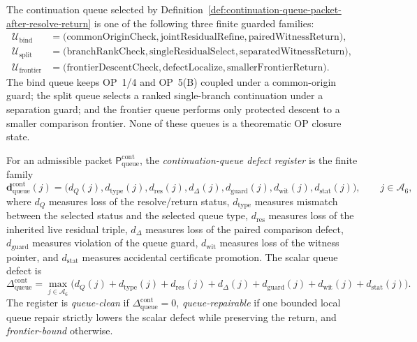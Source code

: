 \begin{definition}
\label{def:bind-split-frontier-continuation-queues}
The continuation queue selected by Definition~\ref{def:continuation-queue-packet-after-resolve-return} is one of the following three finite guarded families:
\[
\begin{aligned}
 \mathcal U_{\mathrm{bind}}
 &=
 \bigl(
 \mathrm{commonOriginCheck},
 \mathrm{jointResidualRefine},
 \mathrm{pairedWitnessReturn}
 \bigr),\\
 \mathcal U_{\mathrm{split}}
 &=
 \bigl(
 \mathrm{branchRankCheck},
 \mathrm{singleResidualSelect},
 \mathrm{separatedWitnessReturn}
 \bigr),\\
 \mathcal U_{\mathrm{frontier}}
 &=
 \bigl(
 \mathrm{frontierDescentCheck},
 \mathrm{defectLocalize},
 \mathrm{smallerFrontierReturn}
 \bigr).
\end{aligned}
\]
The bind queue keeps OP~1/4 and OP~5(B) coupled under a common-origin guard; the split queue selects a ranked single-branch continuation under a separation guard; and the frontier queue performs only protected descent to a smaller comparison frontier. None of these queues is a theorematic OP closure state.
\end{definition}

\begin{definition}
\label{def:continuation-queue-defect-register}
For an admissible packet \(\mathsf P_{\mathrm{queue}}^{\mathrm{cont}}\), the \emph{continuation-queue defect register} is the finite family
\[
 \mathbf d_{\mathrm{queue}}^{\mathrm{cont}}(j)
 =
 \bigl(d_{Q}(j),d_{\mathrm{type}}(j),d_{\mathrm{res}}(j),
 d_{\Delta}(j),d_{\mathrm{guard}}(j),d_{\mathrm{wit}}(j),d_{\mathrm{stat}}(j)\bigr),
 \qquad j\in\mathcal A_6,
\]
where \(d_Q\) measures loss of the resolve/return status, \(d_{\mathrm{type}}\) measures mismatch between the selected status and the selected queue type, \(d_{\mathrm{res}}\) measures loss of the inherited live residual triple, \(d_{\Delta}\) measures loss of the paired comparison defect, \(d_{\mathrm{guard}}\) measures violation of the queue guard, \(d_{\mathrm{wit}}\) measures loss of the witness pointer, and \(d_{\mathrm{stat}}\) measures accidental certificate promotion. The scalar queue defect is
\[
 \Delta_{\mathrm{queue}}^{\mathrm{cont}}
 =
 \max_{j\in\mathcal A_6}
 \bigl(d_Q(j)+d_{\mathrm{type}}(j)+d_{\mathrm{res}}(j)+d_{\Delta}(j)
 +d_{\mathrm{guard}}(j)+d_{\mathrm{wit}}(j)+d_{\mathrm{stat}}(j)\bigr).
\]
The register is \emph{queue-clean} if \(\Delta_{\mathrm{queue}}^{\mathrm{cont}}=0\), \emph{queue-repairable} if one bounded local queue repair strictly lowers the scalar defect while preserving the return, and \emph{frontier-bound} otherwise.
\end{definition}

